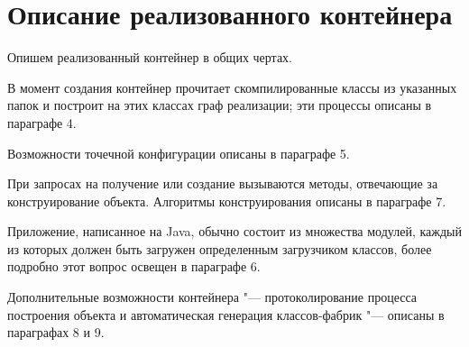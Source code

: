 \section{Описание реализованного контейнера}

Опишем реализованный контейнер в общих чертах.

В момент создания контейнер прочитает скомпилированные классы из указанных папок и построит на этих классах граф реализации; эти процессы описаны в параграфе 4.

Возможности точечной конфигурации описаны в параграфе 5.

При запросах на получение или создание вызываются методы, отвечающие за конструирование объекта. Алгоритмы конструирования описаны в параграфе 7. 

Приложение, написанное на Java, обычно состоит из множества модулей, каждый из которых должен быть загружен определенным загрузчиком классов, более подробно этот вопрос
освещен в параграфе 6.

Дополнительные возможности контейнера "--- протоколирование процесса построения объекта и автоматическая генерация классов-фабрик "--- описаны в параграфах 8 и 9.











